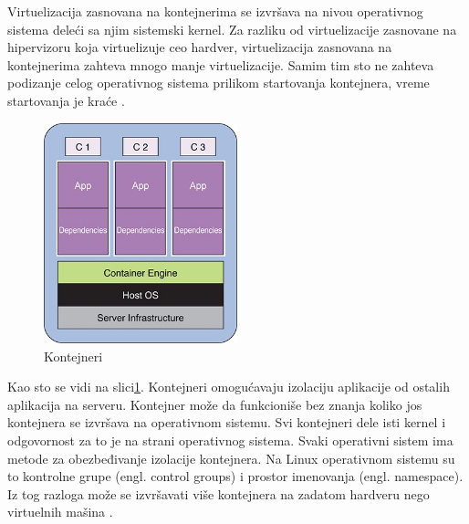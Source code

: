 \documentclass[12pt,oneside]{memoir}
\begin{document}
Virtuelizacija zasnovana na kontejnerima se izvršava na nivou operativnog sistema deleći sa njim sistemski kernel. Za razliku od virtuelizacije zasnovane na hipervizoru koja virtuelizuje ceo hardver, virtuelizacija zasnovana na kontejnerima zahteva mnogo manje virtuelizacije. Samim tim sto ne zahteva podizanje celog operativnog sistema prilikom startovanja kontejnera, vreme startovanja je kraće \cite{gswc}. 
 
\begin{figure}[!ht]
  \centering
  \includegraphics[width=0.5\textwidth]{Slika 4.jpg}
  \caption{Kontejneri}
  \label{fig:kontejneri}
\end{figure}
 
Kao sto se vidi na slici\ref{fig:kontejneri}. Kontejneri omogućavaju izolaciju aplikacije od ostalih aplikacija na serveru. Kontejner može da funkcioniše bez znanja koliko jos kontejnera se izvršava na operativnom sistemu. Svi kontejneri dele isti kernel i odgovornost za to je na strani operativnog sistema. Svaki operativni sistem ima metode za obezbeđivanje izolacije kontejnera. Na Linux operativnom sistemu su to kontrolne grupe (engl. control groups) i prostor imenovanja (engl. namespace). Iz tog razloga može se izvršavati više kontejnera na zadatom hardveru nego virtuelnih mašina \cite{mac}. 
\end{document}
